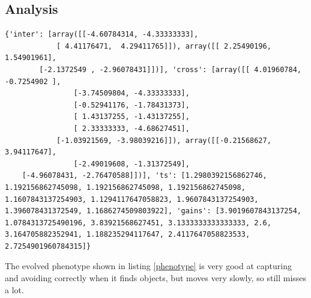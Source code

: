 \documentclass[twoside]{article}
\begin{document}
\begin{multicols}{2}
    \section{Analysis}
    \begin{lstlisting}[caption=Evolved phenotype, label=phenotype]
    {'inter': [array([[-4.60784314, -4.33333333],
            [ 4.41176471,  4.29411765]]), array([[ 2.25490196,  1.54901961],
        [-2.1372549 , -2.96078431]])], 'cross': [array([[ 4.01960784, -0.7254902 ],
                [-3.74509804, -4.33333333],
                [-0.52941176, -1.78431373],
                [ 1.43137255, -1.43137255],
                [ 2.33333333, -4.68627451],
            [-1.03921569, -3.98039216]]), array([[-0.21568627,  3.94117647],
                [-2.49019608, -1.31372549],
    [-4.96078431, -2.76470588]])], 'ts': [1.2980392156862746, 1.192156862745098, 1.192156862745098, 1.192156862745098, 1.1607843137254903, 1.1294117647058823, 1.9607843137254903, 1.396078431372549, 1.1686274509803922], 'gains': [3.9019607843137254, 1.0784313725490196, 3.83921568627451, 3.1333333333333333, 2.6, 3.164705882352941, 1.188235294117647, 2.4117647058823533, 2.7254901960784315]}
    \end{lstlisting}

    The evolved phenotype shown in listing \ref{phenotype} is very good at capturing and avoiding correctly when it finds objects,
    but moves very slowly, so still misses a lot.

\end{multicols}

%
%
\end{document}
